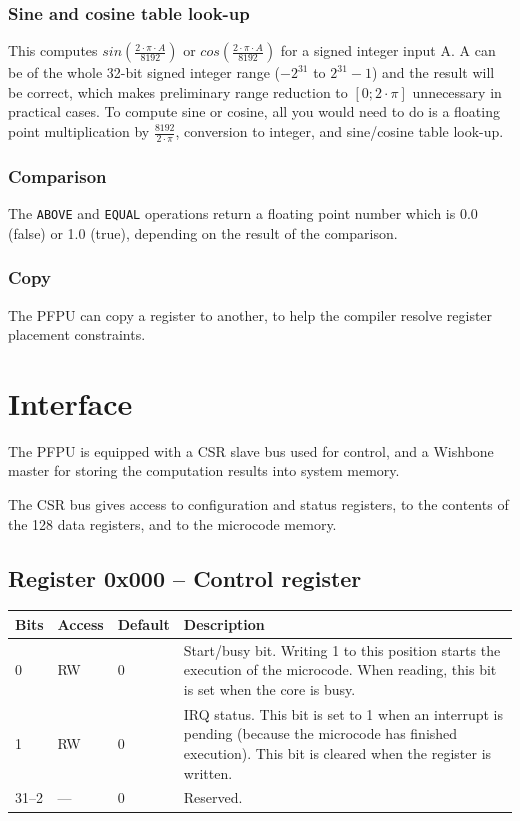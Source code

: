 \documentclass[a4paper,11pt]{article}
\begin{document}
\subsubsection{Sine and cosine table look-up}
This computes $sin(\frac{2 \cdot \pi \cdot A}{8192})$ or $cos(\frac{2 \cdot \pi \cdot A}{8192})$ for a signed integer input A. A can be of the whole 32-bit signed integer range ($-2^{31}$ to $2^{31}-1$) and the result will be correct, which makes preliminary range reduction to $[0;2\cdot\pi]$ unnecessary in practical cases. To compute sine or cosine, all you would need to do is a floating point multiplication by $\frac{8192}{2 \cdot \pi}$, conversion to integer, and sine/cosine table look-up.

\subsubsection{Comparison}
The \verb!ABOVE! and \verb!EQUAL! operations return a floating point number which is 0.0 (false) or 1.0 (true), depending on the result of the comparison.

\subsubsection{Copy}
The PFPU can copy a register to another, to help the compiler resolve register placement constraints.

\section{Interface}
The PFPU is equipped with a CSR slave bus used for control, and a Wishbone master for storing the computation results into system memory.

The CSR bus gives access to configuration and status registers, to the contents of the 128 data registers, and to the microcode memory.

\subsection{Register 0x000 -- Control register}
\begin{tabularx}{\textwidth}{|l|l|l|X|}
\hline
\bf Bits & \bf Access & \bf Default & \bf Description \\
\hline
0 & RW & 0 & Start/busy bit. Writing 1 to this position starts the execution of the microcode. When reading, this bit is set when the core is busy. \\
\hline
1 & RW & 0 & IRQ status. This bit is set to 1 when an interrupt is pending (because the microcode has finished execution). This bit is cleared when the register is written. \\
\hline
31--2 & --- & 0 & Reserved. \\
\hline
\end{tabularx}
\end{document}
